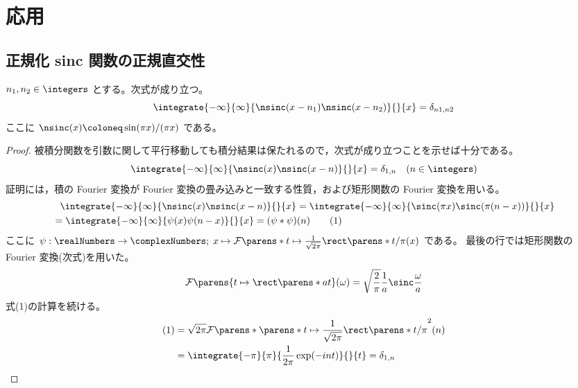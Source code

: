     \section{応用}
        \subsection{正規化 sinc 関数の正規直交性}
            \begin{shadebox}
                $n_1,n_2\in\integers$ とする。次式が成り立つ。
                \[ \integrate{-\infty}{\infty}{\nsinc(x-n_1) \nsinc(x-n_2)}{}{x} = \delta_{n1,n2} \]
                ここに $\nsinc(x) \coloneq \sin(\pi x)/(\pi x)$ である。
            \end{shadebox}
            \begin{proof}
                \quad\par
                被積分関数を引数に関して平行移動しても積分結果は保たれるので，次式が成り立つことを示せば十分である。
                \[ \integrate{-\infty}{\infty}{\nsinc(x)\nsinc(x-n)}{}{x} = \delta_{1,n} \quad (n\in\integers) \]
                証明には，積の Fourier 変換が Fourier 変換の畳み込みと一致する性質，および矩形関数の Fourier 変換を用いる。
                \begin{align*}
                    &\phantom{=} \integrate{-\infty}{\infty}{\nsinc(x)\nsinc(x-n)}{}{x} = \integrate{-\infty}{\infty}{\sinc(\pi x)\sinc(\pi(n-x))}{}{x} \\
                    &= \integrate{-\infty}{\infty}{\psi(x)\psi(n-x)}{}{x} = (\psi*\psi)(n) \tag{1}
                \end{align*}
                ここに $\psi: \realNumbers\to\complexNumbers;\;x\mapsto\mathcal{F}\parens*{t\mapsto\frac{1}{\sqrt{2\pi}}\rect\parens*{t/\pi}}(x)$ である。
                最後の行では矩形関数の Fourier 変換(次式)を用いた。
                \[ \mathcal{F}\parens{t\mapsto\rect\parens*{at}}(\omega) = \sqrt{\frac{2}{\pi}}\frac{1}{a}\sinc\frac{\omega}{a} \]
                式(1)の計算を続ける。
                \begin{align*}
                    (1) &= \sqrt{2\pi}\mathcal{F}\parens*{\parens*{t\mapsto\frac{1}{\sqrt{2\pi}}\rect\parens*{t/\pi}}^2}(n) \\
                    &= \integrate{-\pi}{\pi}{\frac{1}{2\pi}\exp(-i n t)}{}{t} = \delta_{1,n}
                \end{align*}
            \end{proof}